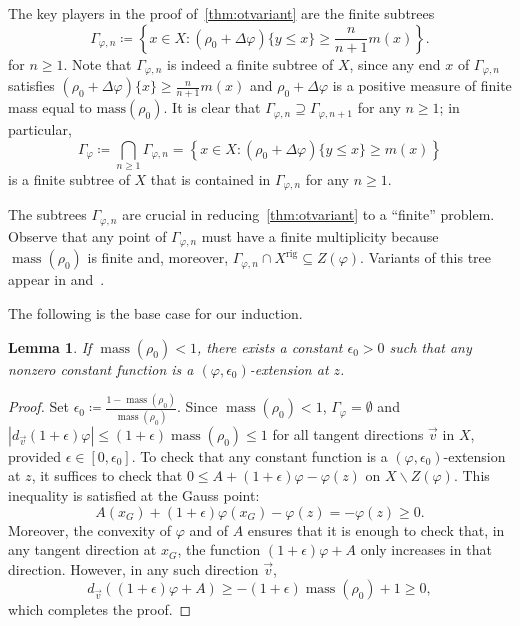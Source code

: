 \documentclass[10pt,reqno]{amsart}
\theoremstyle{plain}
\newtheorem{lemma}[theorem]{Lemma}
\theoremstyle{definition}
\numberwithin{equation}{section}
\DeclareMathOperator{\mass}{mass}
\DeclareMathOperator{\rig}{rig}
\begin{document}
The key players in the proof of~\cref{thm:otvariant} are the finite subtrees
$$
\Gamma_{\varphi,n} \coloneqq \left\{ x \in X \colon (\rho_0 + \Delta \varphi) \{ y \leq x \} \geq \frac{n}{n+1} m(x) \right\}.
$$
for $n \geq 1$. 
Note that $\Gamma_{\varphi,n}$ is indeed a finite subtree of $X$, since any end $x$ of $\Gamma_{\varphi,n}$ satisfies $(\rho_0 + \Delta \varphi) \{ x \} \geq \frac{n}{n+1} m(x)$ and $\rho_0 + \Delta\varphi$ is a positive measure of finite mass equal to $\textrm{mass}(\rho_0)$.
It is clear that $\Gamma_{\varphi,n} \supseteq \Gamma_{\varphi,n+1}$ for any $n \geq 1$; in particular,
$$
\Gamma_{\varphi} \coloneqq \bigcap_{n \geq 1} \Gamma_{\varphi,n} = \left\{ x \in X \colon (\rho_0 + \Delta \varphi) \{ y \leq x \} \geq m(x) \right\}
$$
is a finite subtree of $X$ that is contained in $\Gamma_{\varphi,n}$ for any $n \geq 1$.


The subtrees $\Gamma_{\varphi,n}$ are crucial in reducing~\cref{thm:otvariant} to a ``finite'' problem.
Observe that any point of $\Gamma_{\varphi,n}$ must have a finite multiplicity because $\mass(\rho_0)$ is finite and, moreover, $\Gamma_{\varphi,n} \cap X^{\rig} \subseteq Z(\varphi)$. Variants of this tree appear in \cite[Prop 2.8]{dynberko} and~\cite[Lem 7.7]{favre-jonsson}.

The following is the base case for our induction.

\begin{lemma}\label{lemma:one_variant}
If $\mass(\rho_0) < 1$, there exists a constant $\epsilon_0 > 0$ such that any nonzero constant function is a $(\varphi,\epsilon_0)$-extension at $z$.
\end{lemma}

\begin{proof}
Set $\epsilon_0 \coloneqq \frac{1-\mass(\rho_0)}{\mass(\rho_0)}$. Since $\mass(\rho_0) < 1$, $\Gamma_{\varphi} = \emptyset$ and $|d_{\vec{v}} (1+\epsilon) \varphi| \leq (1+\epsilon)\mass(\rho_0) \leq 1$ for all tangent directions $\vec{v}$ in $X$, provided $\epsilon \in [0,\epsilon_0]$. To check that any constant function is a $(\varphi,\epsilon_0)$-extension at $z$, it suffices to check that $0 \leq A + (1+\epsilon)\varphi - \varphi(z)$ on $X \backslash Z(\varphi)$. This inequality is satisfied at the Gauss point:
$$
A(x_G) + (1+\epsilon)\varphi(x_G) - \varphi(z) = -\varphi(z) \geq 0.
$$
Moreover, the convexity of $\varphi$ and of $A$ ensures that it is enough to check that, in any tangent direction at $x_G$, the function $(1+\epsilon)\varphi + A$ only increases in that direction. 
However, in any such direction $\vec{v}$, 
$$d_{\vec{v}}\left( (1+\epsilon)\varphi + A \right) \geq -(1+\epsilon)\mass(\rho_0) + 1 \geq 0,$$
which completes the proof.
\end{proof}
\end{document}
